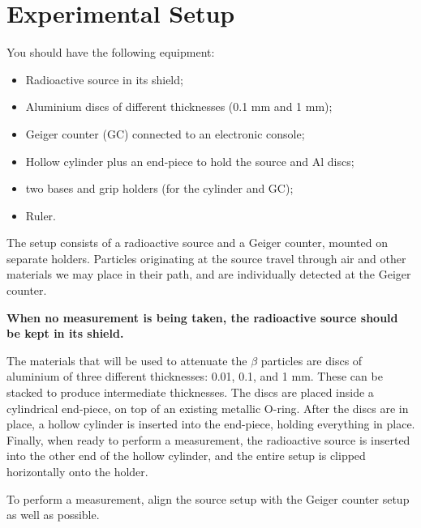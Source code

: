 \section{Experimental Setup}

You should have the following equipment:

\begin{itemize}
\item{Radioactive source in its shield;}
\item{Aluminium discs of different thicknesses (0.1 mm and 1 mm);}
\item{Geiger counter (GC) connected to an electronic console;}
\item{Hollow cylinder plus an end-piece to hold the source and Al discs;}
\item{two bases and grip holders (for the cylinder and GC);}
\item{Ruler.}
\end{itemize}


The setup consists of a radioactive source and a Geiger counter, mounted on separate holders. Particles originating at the source travel through air and other materials we may place in their path, and are individually detected at the Geiger counter.

\textbf{When no measurement is being taken, the radioactive source should be kept in its shield.}

The materials that will be used to attenuate the $\beta$ particles are discs of aluminium of three different thicknesses: 0.01, 0.1, and 1 mm. These can be stacked to produce intermediate thicknesses. The discs are placed inside a cylindrical end-piece, on top of an existing metallic O-ring. After the discs are in place, a hollow cylinder is inserted into the end-piece, holding everything in place. Finally, when ready to perform a measurement, the radioactive source is inserted into the other end of the hollow cylinder, and the entire setup is clipped horizontally onto the holder.

To perform a measurement, align the source setup with the Geiger counter setup as well as possible.
